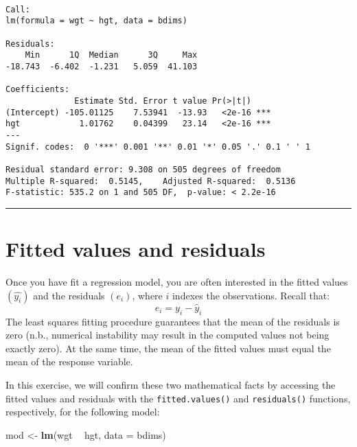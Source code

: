 \documentclass[
]{book}
\newenvironment{Shaded}{\begin{snugshade}}{\end{snugshade}}
\newcommand{\DataTypeTok}[1]{\textcolor[rgb]{0.13,0.29,0.53}{#1}}
\newcommand{\KeywordTok}[1]{\textcolor[rgb]{0.13,0.29,0.53}{\textbf{#1}}}
\newcommand{\NormalTok}[1]{#1}
\newcommand{\OperatorTok}[1]{\textcolor[rgb]{0.81,0.36,0.00}{\textbf{#1}}}
\newcommand{\StringTok}[1]{\textcolor[rgb]{0.31,0.60,0.02}{#1}}
\begin{document}
\begin{verbatim}

Call:
lm(formula = wgt ~ hgt, data = bdims)

Residuals:
    Min      1Q  Median      3Q     Max 
-18.743  -6.402  -1.231   5.059  41.103 

Coefficients:
              Estimate Std. Error t value Pr(>|t|)    
(Intercept) -105.01125    7.53941  -13.93   <2e-16 ***
hgt            1.01762    0.04399   23.14   <2e-16 ***
---
Signif. codes:  0 '***' 0.001 '**' 0.01 '*' 0.05 '.' 0.1 ' ' 1

Residual standard error: 9.308 on 505 degrees of freedom
Multiple R-squared:  0.5145,    Adjusted R-squared:  0.5136 
F-statistic: 535.2 on 1 and 505 DF,  p-value: < 2.2e-16
\end{verbatim}

\begin{center}\rule{0.5\linewidth}{0.5pt}\end{center}

\hypertarget{fitted-values-and-residuals}{%
\section{Fitted values and residuals}\label{fitted-values-and-residuals}}

Once you have fit a regression model, you are often interested in the fitted values \((\hat{y_i})\) and the residuals \(({e_i})\), where \(i\) indexes the observations. Recall that:
\begin{equation}
e_i = y_i - \hat{y}_i
\end{equation}
The least squares fitting procedure guarantees that the mean of the residuals is zero (n.b., numerical instability may result in the computed values not being exactly zero). At the same time, the mean of the fitted values must equal the mean of the response variable.

In this exercise, we will confirm these two mathematical facts by accessing the fitted values and residuals with the \texttt{fitted.values()} and \texttt{residuals()} functions, respectively, for the following model:

\begin{Shaded}
\begin{Highlighting}[]
\NormalTok{mod <-}\StringTok{ }\KeywordTok{lm}\NormalTok{(wgt }\OperatorTok{~}\StringTok{ }\NormalTok{hgt, }\DataTypeTok{data =}\NormalTok{ bdims)}
\end{Highlighting}
\end{Shaded}
\end{document}
